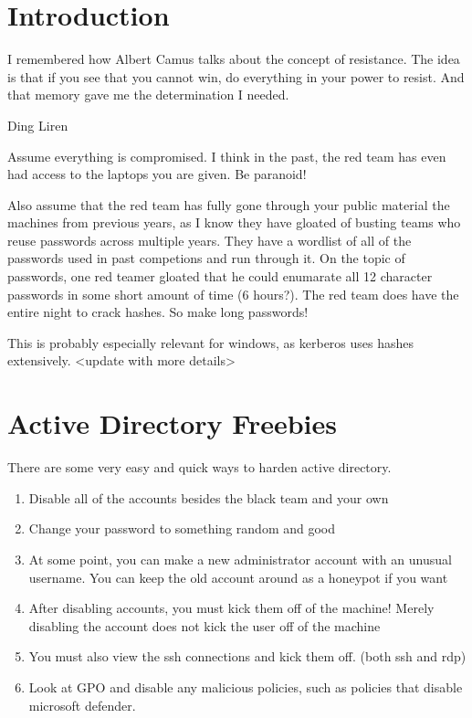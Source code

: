 \documentclass{article}
\begin{document}
\graphicspath{ {./Images/} }
\tableofcontents

\section{Introduction}
\epigraph{I remembered how Albert Camus talks about the concept of resistance. 
The idea is that if you see that you cannot win, do everything in your power to resist. And that memory gave me the determination I needed.}
{Ding Liren}

Assume everything is compromised. I think in the past, the red team has even had access to the laptops you are given. Be paranoid!

Also assume that the red team has fully gone through your public material the machines from previous years, as
I know they have gloated of busting teams who reuse passwords across multiple years.
They have a wordlist of all of the passwords used in past competions and run through it. 
On the topic of passwords, one red teamer gloated that he could enumarate all 12 character passwords in some short amount of time (6 hours?).
The red team does have the entire night to crack hashes. So make long passwords!

This is probably especially relevant for windows, as kerberos uses hashes extensively. <update with more details>

\section{Active Directory Freebies}
There are some very easy and quick ways to harden active directory.

\begin{enumerate}
        \item Disable all of the accounts besides the black team and your own
        \item Change your password to something random and good
        \item At some point, you can make a new administrator account with an unusual username. You can keep the old account around as a honeypot if you want
        \item After disabling accounts, you must kick them off of the machine! Merely disabling the account does not kick the user off of the machine
        \item You must also view the ssh connections and kick them off. (both ssh and rdp)
        \item Look at GPO and disable any malicious policies, such as policies that disable microsoft defender.
\end{enumerate}
\end{document}

